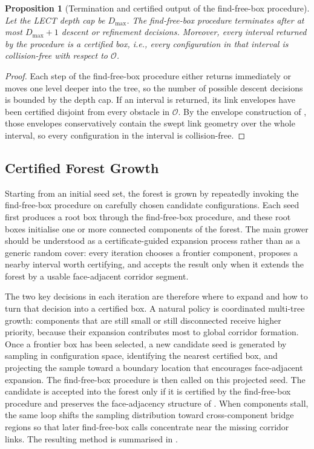 \documentclass[journal]{IEEEtran}
\newtheorem{proposition}{Proposition}
\newcommand{\calO}{\ensuremath{\mathcal{O}}}
\begin{document}
\begin{proposition}[Termination and certified output of the find-free-box procedure]
\label{prop:ffb_rewrite}
Let the LECT depth cap be $D_{\max}$. The find-free-box procedure terminates
after at most $D_{\max}+1$ descent or refinement decisions. Moreover, every
interval returned by the procedure is a certified box, i.e., every
configuration in that interval is collision-free with respect to $\calO$.
\end{proposition}

\begin{proof}
Each step of the find-free-box procedure either returns immediately or moves
one level deeper into the tree, so the number of possible descent decisions
is bounded by the depth cap. If an interval is returned, its link envelopes
have been certified disjoint from every obstacle in $\calO$. By the envelope
construction of , those envelopes conservatively
contain the swept link geometry over the whole interval, so every configuration
in the interval is collision-free.
\end{proof}

\subsection{Certified Forest Growth}\label{sec:forest_growth}

Starting from an initial seed set, the forest is grown by repeatedly invoking
the find-free-box procedure on carefully chosen candidate configurations.
Each seed first produces a root box through the find-free-box procedure, and
these root boxes initialise one or more connected components of the forest.
The main grower should be understood as a
certificate-guided expansion process rather than as a generic random cover:
every iteration chooses a frontier component, proposes a nearby interval worth
certifying, and accepts the result only when it extends the forest by a usable
face-adjacent corridor segment.

The two key decisions in each iteration are therefore where to expand and how
to turn that decision into a certified box. A natural policy is coordinated
multi-tree growth: components that are still small or still disconnected
receive higher priority, because their expansion contributes most to global
corridor formation. Once a frontier box has been selected, a new candidate seed
is generated by sampling in configuration space, identifying the nearest
certified box, and projecting the sample toward a boundary location that
  encourages face-adjacent expansion. The find-free-box procedure is then called on this projected seed.
  The candidate is accepted into the forest only if it is certified by the
  find-free-box procedure and preserves the face-adjacency structure of
  . When
components stall, the same loop shifts the sampling distribution toward
  cross-component bridge regions so that later find-free-box calls concentrate near the
missing corridor links. The resulting method is summarised in
.
\end{document}
